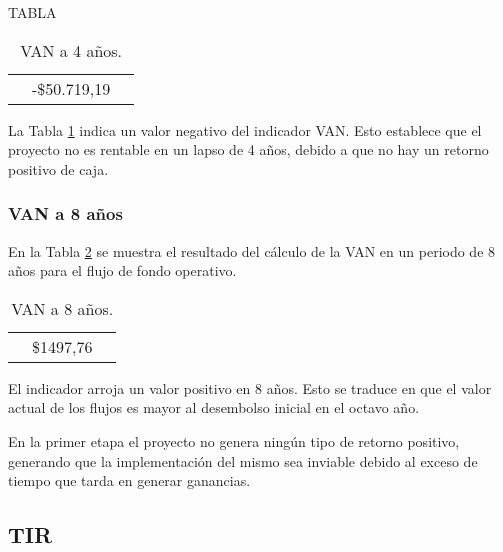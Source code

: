 TABLA
\begin{table}[H]
  \centering
    \begin{tabular}{|cc|r|}
    \rowcolor[rgb]{ .773,  .851,  .945} \multicolumn{3}{c}{\textbf{a 4 años}} \bigstrut[b]\\
    \hline
    \rowcolor[rgb]{ .773,  .851,  .945} \multicolumn{2}{|c|}{\textbf{VAN }} & \cellcolor[rgb]{ 1,  1,  1}\textcolor[rgb]{ 1,  0,  0}{-\$50.719,19} \bigstrut\\
    \hline
    \end{tabular}%
  \caption{VAN a 4 años.}  
  \label{tab:van-4}%
\end{table}%


La Tabla \ref{tab:van-4} indica un valor negativo del indicador VAN. Esto establece que el proyecto no es rentable en un lapso de 4 años, debido a que no hay un retorno positivo de caja. 

\subsubsection{VAN a 8 años}

En la Tabla \ref{tab:van-8} se muestra el resultado del cálculo de la VAN en un periodo de 8 años para el flujo de fondo operativo.

\begin{table}[H]
  \centering

    \begin{tabular}{|cc|r|}
    \rowcolor[rgb]{ .773,  .851,  .945} \multicolumn{3}{c}{\textbf{a 8 años}} \bigstrut[b]\\
    \hline
    \rowcolor[rgb]{ .773,  .851,  .945} \multicolumn{2}{|c|}{\textbf{VAN }} & \cellcolor[rgb]{ 1,  1,  1}\$1497,76 \bigstrut\\
    \hline
    \end{tabular}%
  \caption{VAN a 8 años.}    
  \label{tab:van-8}%
\end{table}%


El indicador arroja un valor positivo en 8 años. Esto se traduce en que el valor actual de los flujos es mayor al desembolso inicial en el octavo año.

En la primer etapa el proyecto no genera ningún tipo de retorno positivo, generando que la implementación del mismo sea inviable debido al exceso de tiempo que tarda en generar ganancias.

\subsection{TIR}

